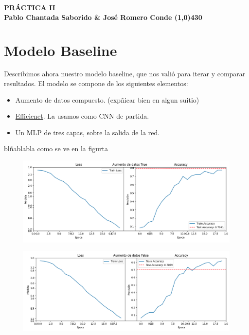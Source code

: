 \documentclass{article}
\begin{document}
	\begin{center}
		\LARGE\bfseries PRÁCTICA II\\
		\small Pablo Chantada Saborido \& José Romero Conde
		\line(1,0){430}
	\end{center}
	
	
\section*{Modelo Baseline}

Describimos ahora nuestro modelo baseline, que nos valió para iterar y comparar resultados. El modelo se compone de los siguientes elementos:

\begin{itemize}
	\item Aumento de datos compuesto. (expñicar bien en algun suitio)
	\item  \href{https://arxiv.org/pdf/1905.11946}{Efficienet}. La usamos como CNN de partida.
	\item Un MLP de tres capas, sobre la salida de la red.
\end{itemize}

blñablabla como se ve en la figurta



\begin{figure}[h]
	\centering
	\includegraphics[width=0.7\linewidth]{baselineCon}
	\caption{}
	\label{fig:baselinecon}
\end{figure}

\begin{figure}[h]
	\centering
	\includegraphics[width=0.7\linewidth]{baselineSin}
	\caption{}
	\label{fig:baselinesin}
\end{figure}
\end{document}
